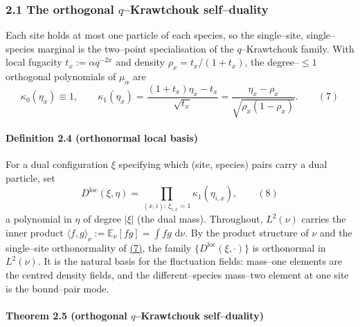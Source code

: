 \documentclass[11pt]{article}
\theoremstyle{plain}
\theoremstyle{definition}
\theoremstyle{remark}
\newcommand{\E}{\mathbb{E}}\newcommand{\PP}{\mathbb{P}}\newcommand{\dd}{\,\mathrm{d}}
\begin{document}
\subsubsection{2.1 The orthogonal \texorpdfstring{$q$}{q}--Krawtchouk self--duality}
Each site holds at most one particle of each species, so the single--site,
single--species marginal is the two--point specialisation of the $q$--Krawtchouk
family. With local fugacity $t_x:=\alpha q^{-2x}$ and density $\rho_x=t_x/(1+t_x)$,
the degree--$\le1$ orthogonal polynomials of $\mu_\alpha$ are
\label{eq_d1}
\begin{equation}
  \kappa_0(\eta_x)\equiv1,\qquad
  \kappa_1(\eta_x)=\frac{(1+t_x)\eta_x-t_x}{\sqrt{t_x}}
  =\frac{\eta_x-\rho_x}{\sqrt{\rho_x(1-\rho_x)}}.\qquad(7)
\end{equation}

\paragraph{Definition 2.4 (orthonormal local basis)}\label{def_D}

For a dual configuration $\xi$ specifying which (site, species) pairs carry a dual
particle, set
\label{eq_Dfac}
\begin{equation}
  D^{\mathrm{loc}}(\xi,\eta)=\prod_{(x,i):\,\xi_{i,x}=1}\kappa_1(\eta_{i,x}),\qquad(8)
\end{equation}
a polynomial in $\eta$ of degree $|\xi|$ (the dual mass). Throughout, $L^2(\nu)$ carries
the inner product $\langle f,g\rangle_\nu:=\E_\nu[fg]=\int fg\,\dd\nu$. By the product
structure of $\nu$ and the single--site orthonormality of \hyperref[eq_d1]{(7)}, the family
$\{D^{\mathrm{loc}}(\xi,\cdot)\}$ is orthonormal in $L^2(\nu)$. It is the natural
basis for the fluctuation fields: mass--one elements are the centred density fields,
and the different--species mass--two element at one site is the bound--pair mode.
\par

\paragraph{Theorem 2.5 (orthogonal $q$--Krawtchouk self--duality)}\label{thm_dual}
\end{document}
